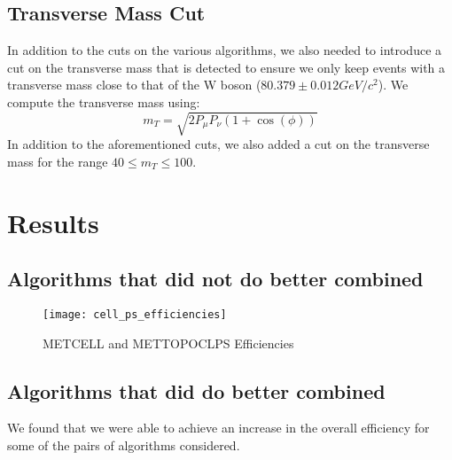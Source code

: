 \subsection{Transverse Mass Cut}
In addition to the cuts on the various algorithms, we also needed to introduce a cut on the transverse mass that is detected to ensure we only keep events with a transverse mass close to that of the W boson ($80.379\pm 0.012 GeV/c^2$). 
We compute the transverse mass using:
$$m_{T}=\sqrt{2P_{\mu}P_{\nu}(1+\cos{(\phi)})}$$
In addition to the aforementioned cuts, we also added a cut on the transverse mass for the range $40 \leq m_{T} \leq 100$. 
\section{Results}
\subsection{Algorithms that did not do better combined}
\begin{figure}[H]
        \centering
        \texttt{[image: cell\_ps\_efficiencies]}
        \caption{METCELL and METTOPOCLPS Efficiencies}
\end{figure}
\subsection{Algorithms that did do better combined}
We found that we were able to achieve an increase in the overall efficiency for some of the pairs of algorithms considered. 


